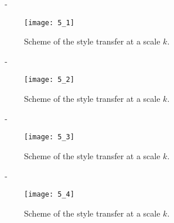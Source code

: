 \documentclass[aspectratio=169, 22pt]{beamer}
\begin{document}
\begin{frame}[noframenumbering]{\secname~- \subsecname}
  \begin{figure}
    \centering
    \texttt{[image: 5\_1]}
    \caption{Scheme of the style transfer at a scale $k$.}
  \end{figure}
\end{frame}

\begin{frame}[noframenumbering]{\secname~- \subsecname}
  \begin{figure}
    \centering
    \texttt{[image: 5\_2]}
    \caption{Scheme of the style transfer at a scale $k$.}
  \end{figure}
\end{frame}

\begin{frame}[noframenumbering]{\secname~- \subsecname}
  \begin{figure}
    \centering
    \texttt{[image: 5\_3]}
    \caption{Scheme of the style transfer at a scale $k$.}
  \end{figure}
\end{frame}

\begin{frame}[noframenumbering]{\secname~- \subsecname}
  \begin{figure}
    \centering
    \texttt{[image: 5\_4]}
    \caption{Scheme of the style transfer at a scale $k$.}
  \end{figure}
\end{frame}
\end{document}
